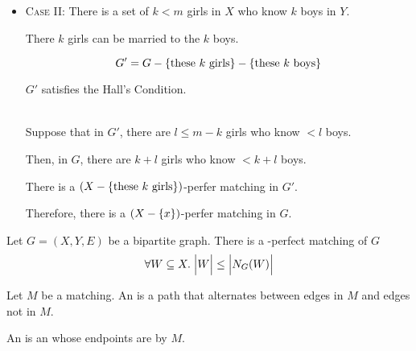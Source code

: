 \begin{frame}{}
  \begin{itemize}
    \item \textsc{Case II:} There is a set of $k < m$ girls in $X$
      who know $k$ boys in $Y$.

      \begin{center}
        \pause
        \vspace{0.30cm}
        There $k$ girls can be married  to the $k$ boys.

        \pause
        \[
          G' = G - \{\text{these $k$ girls}\} - \{\text{these $k$ boys}\}
        \]

        \pause
        $G'$ satisfies the Hall's Condition.

        \pause
        \vspace{0.30cm}
         \\[6pt]
        Suppose that in $G'$, there are $l \le m - k$ girls who know $< l$ boys.

        \pause
        \vspace{0.30cm}
        Then, in $G$, there are $k + l$ girls who know $< k + l$ boys.

        \pause
        \vspace{0.50cm}
        There is a $(X - \{\text{these $k$ girls}\})$-perfer matching in $G'$.

        \pause
        \vspace{0.30cm}
        Therefore, there is a $(X - \{x\})$-perfer matching in $G$.
      \end{center}
  \end{itemize}
\end{frame}

\begin{frame}{}
  \begin{theorem}
    Let $G = (X, Y, E)$ be a bipartite graph.
    There is a -perfect matching of $G$ 
    \[
      \forall W \subseteq X.\; \Big\lvert W \Big\rvert \le \Big\lvert N_{G}(W) \Big\rvert
    \]
  \end{theorem}
\end{frame}

\begin{frame}{}
  \begin{definition}
    Let $M$ be a matching.
    An  is a path that alternates
    between edges in $M$ and edges not in $M$.
  \end{definition}

  \vspace{0.80cm}

  \pause
  \vspace{0.60cm}
  \begin{definition}
    An  is an 
    whose endpoints are  by $M$.
  \end{definition}
\end{frame}

